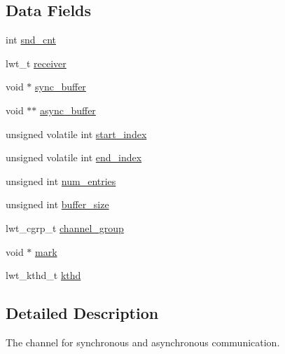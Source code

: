 \subsection*{Data Fields}
\begin{DoxyCompactItemize}
\item 
int \hyperlink{structlwt__channel_ab7687f6e58c0d4cb4c2de7db501fb046}{snd\+\_\+cnt}
\item 
lwt\+\_\+t \hyperlink{structlwt__channel_a740680d836200bfc87150333e4d62785}{receiver}
\item 
void $\ast$ \hyperlink{structlwt__channel_a19260280268d501a8e6d341c21eba961}{sync\+\_\+buffer}
\item 
void $\ast$$\ast$ \hyperlink{structlwt__channel_a52a4a997c097ddda52e23b0bf61216e2}{async\+\_\+buffer}
\item 
unsigned volatile int \hyperlink{structlwt__channel_aa4256bc415edf531c5abf77d0103e0d4}{start\+\_\+index}
\item 
unsigned volatile int \hyperlink{structlwt__channel_a7d50dd3c2091efb575652f445e0cee50}{end\+\_\+index}
\item 
unsigned int \hyperlink{structlwt__channel_ad937a8d4e82d1f7a66b36b4cbe66dd86}{num\+\_\+entries}
\item 
unsigned int \hyperlink{structlwt__channel_a7d896c4332bb4d47380135f3fed6aa33}{buffer\+\_\+size}
\item 
lwt\+\_\+cgrp\+\_\+t \hyperlink{structlwt__channel_a6e34c7480bc23f6ea1db12c69adec0d9}{channel\+\_\+group}
\item 
void $\ast$ \hyperlink{structlwt__channel_a83384d85ee5b6089fdec51fd65bf33d0}{mark}
\item 
lwt\+\_\+kthd\+\_\+t \hyperlink{structlwt__channel_abda2a1d20a8d1231c134892c4e85ccf1}{kthd}
\end{DoxyCompactItemize}


\subsection{Detailed Description}
The channel for synchronous and asynchronous communication. 

